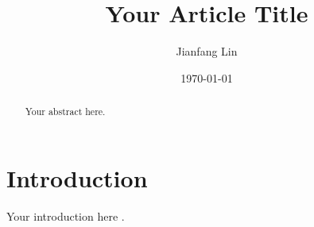 \documentclass{article}
\title{Your Article Title}
\author{Jianfang Lin}
\date{\today}
\begin{document}
\maketitle

\begin{abstract}
Your abstract here.
\end{abstract}

\section{Introduction}
Your introduction here \cite{example}.



\end{document}
